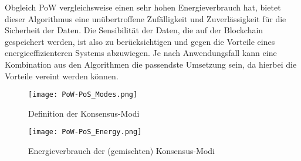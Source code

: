 Obgleich PoW vergleichsweise einen sehr hohen Energieverbrauch hat, bietet dieser Algorithmus eine 
unübertroffene Zufälligkeit und Zuverlässigkeit für die Sicherheit der Daten.
\cite[p.281]{Nair2021Energy}
Die Sensibilität der Daten, die auf der Blockchain gespeichert werden, ist also zu berücksichtigen und
gegen die Vorteile eines energieeffizienteren Systems abzuwiegen. Je nach Anwendungsfall kann eine 
Kombination aus den Algorithmen die passendste Umsetzung sein, da hierbei die Vorteile vereint werden 
können.












\begin{figure}[!h]
    \begin{center}
        \texttt{[image: PoW-PoS\_Modes.png]}
    \end{center}
    \caption{Definition der Konsensus-Modi}
    \label{fig:PoWPoS_Modes}
\end{figure}

\begin{figure}[!h]
    \begin{center}
        \texttt{[image: PoW-PoS\_Energy.png]}
    \end{center}
    \caption{Energieverbrauch der (gemischten) Konsensus-Modi}
    \label{fig:PoWPoS_Energy}
\end{figure}







